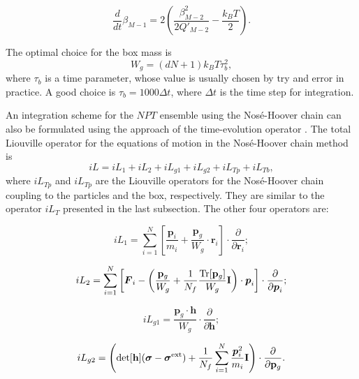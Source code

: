 \documentclass[12pt,a4paper]{report}
\newcommand{\vect}[1]{\boldsymbol{#1}}
\begin{document}
\begin{equation}
\frac{d}{dt} \beta_{M-1} =
2\left( \frac{\beta_{M-2}^2}{2Q'_{M-2}} - \frac{k_BT}{2} \right).
\end{equation}


The optimal choice \cite{martyna1992jcp} for the box mass is
\begin{equation}
W_g = (dN+1)k_BT\tau_b^2,
\end{equation}
where $\tau_b$ is a time parameter, whose value is usually chosen by try and error in practice. A good choice is $\tau_b = 1000 \Delta t$, where $\Delta t$ is the time step for integration.

An integration scheme for the $NPT$ ensemble using the Nos\'{e}-Hoover chain can also be formulated using the approach of the time-evolution operator \cite{martyna1996mp,tuckerman2010}. The total Liouville operator for the equations of motion in the Nos\'{e}-Hoover chain method is \cite{martyna1996mp,tuckerman2010}
\begin{equation}
iL = iL_1 + iL_2 + iL_{g1} + iL_{g2} + iL_{Tp} + iL_{Tb},
\end{equation}
where $iL_{Tp}$ and $iL_{Tp}$ are the Liouville operators for the Nos\'{e}-Hoover chain coupling to the particles and the box, respectively. They are similar to the operator $iL_{T}$ presented in the last subsection. The other four operators are:

\begin{equation}
iL_1 = \sum_{i=1}^N
\left[\frac{\vect{p}_i}{m_i} + \frac{\mathbf{p}_g}{W_g} \cdot \vect{r}_i\right] \cdot
\frac{\partial }{\partial \vect{r}_i};
\end{equation}

\begin{equation}
iL_2 = \sum_{i=1}^N
\left[\vect{F}_i - \left(\frac{\mathbf{p}_g}{W_g} + \frac{1}{N_f}\frac{\textmd{Tr}[\mathbf{p}_g]}{W_g}  \mathbf{I}\right) \cdot \vect{p}_i \right]\cdot
\frac{\partial }{\partial \vect{p}_i};
\end{equation}


\begin{equation}
iL_{g1} = \frac{\mathbf{p}_g \cdot \mathbf{h}}{W_g} \cdot
\frac{\partial }{\partial \mathbf{h}};
\end{equation}


\begin{equation}
iL_{g2} = \left(\det[\mathbf{h}] (\boldsymbol{\sigma}-\boldsymbol{\sigma}^{\rm ext}) + \frac{1}{N_f} \sum_{i=1}^N \frac{\vect{p}_i^2}{m_i} \mathbf{I}\right) \cdot
\frac{\partial }{\partial \mathbf{p}_g}.
\end{equation}
\end{document}
